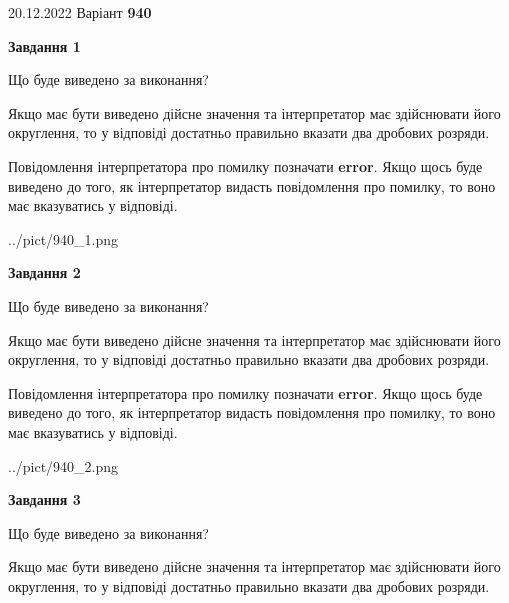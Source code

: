\documentclass[12pt, ukrainian]{article}
\begin{document}
{20.12.2022 Варіант \No \textbf { 940 }\par}
{
\begin {Large}

{\begin {center}\textbf{Завдання 1}\end {center}}\par
Що буде виведено за виконання? \par

Якщо має бути виведено дійсне значення та інтерпретатор має здійснювати його округлення, 
то у відповіді достатньо правильно вказати два дробових розряди.

Повідомлення інтерпретатора про помилку позначати \textbf{error}.
Якщо щось буде виведено до того, як інтерпретатор видасть повідомлення про помилку, 
то воно має вказуватись у відповіді. \par

\begin{center}
	{../pict/940_1.png}
\end{center}
\newpage

{\begin {center}\textbf{Завдання 2}\end {center}}\par
Що буде виведено за виконання? \par

Якщо має бути виведено дійсне значення та інтерпретатор має здійснювати його округлення, 
то у відповіді достатньо правильно вказати два дробових розряди.

Повідомлення інтерпретатора про помилку позначати \textbf{error}.
Якщо щось буде виведено до того, як інтерпретатор видасть повідомлення про помилку, 
то воно має вказуватись у відповіді. \par

\begin{center}
	{../pict/940_2.png}
\end{center}
\newpage

{\begin {center}\textbf{Завдання 3}\end {center}}\par
Що буде виведено за виконання? \par

Якщо має бути виведено дійсне значення та інтерпретатор має здійснювати його округлення, 
то у відповіді достатньо правильно вказати два дробових розряди.


\end{Large}}
\end{document}
